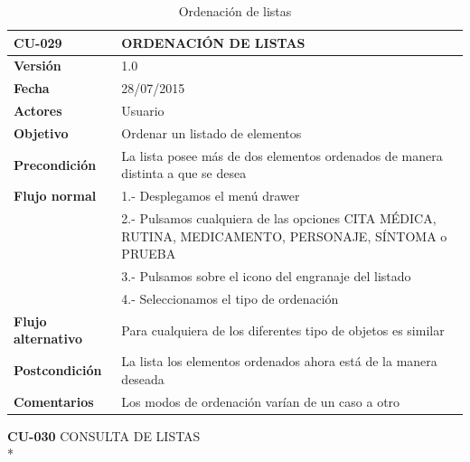\documentclass[../pfc.tex]{subfiles}
\begin{document}
	\begin{table}[H]
		\centering
		\begin{tabular}[t]{|p{3cm}|p{9.5cm}|}
			\hline \textbf{CU-029} & \textbf{ORDENACIÓN DE LISTAS} \\*
			\hline\hline \textbf{Versión} & 1.0 \\*
			\hline\hline \textbf{Fecha} & 28/07/2015 \\*
			\hline\textbf{Actores} 	& Usuario\\*
			\hline \textbf{Objetivo} & Ordenar un listado de elementos\\* 			
			\hline \textbf{Precondición} & La lista posee más de dos elementos ordenados de manera distinta a que se desea\\* 
			\hline \textbf{Flujo normal} & 1.- Desplegamos el menú drawer \\* 
			& 2.- Pulsamos cualquiera de las opciones CITA MÉDICA, RUTINA, MEDICAMENTO, PERSONAJE, SÍNTOMA o PRUEBA\\*	
			& 3.- Pulsamos sobre el icono del engranaje del listado\\*	
			& 4.- Seleccionamos el tipo de ordenación\\*	
			\hline \textbf{Flujo alternativo} & Para cualquiera de los diferentes tipo de objetos es similar \\* 
			\hline \textbf{Postcondición} & La lista los elementos ordenados ahora está de la manera deseada\\* 
			\hline \textbf{Comentarios}   & Los modos de ordenación varían de un caso a otro\\*
			\hline
		\end{tabular}
		\caption{Ordenación de listas}
		\label{tabla:caso029}
	\end{table}

	\clearpage

	\textbf{CU-030}	CONSULTA DE LISTAS\\* 
	
\end{document}
